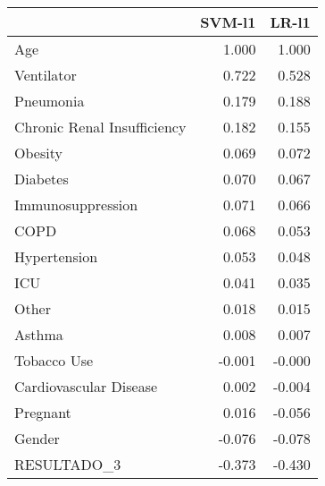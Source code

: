 \begin{tabular}{lrr}
\toprule
{} &  SVM-l1 &  LR-l1 \\
\midrule
Age                         &   1.000 &  1.000 \\
Ventilator                  &   0.722 &  0.528 \\
Pneumonia                   &   0.179 &  0.188 \\
Chronic Renal Insufficiency &   0.182 &  0.155 \\
Obesity                     &   0.069 &  0.072 \\
Diabetes                    &   0.070 &  0.067 \\
Immunosuppression           &   0.071 &  0.066 \\
COPD                        &   0.068 &  0.053 \\
Hypertension                &   0.053 &  0.048 \\
ICU                         &   0.041 &  0.035 \\
Other                       &   0.018 &  0.015 \\
Asthma                      &   0.008 &  0.007 \\
Tobacco Use                 &  -0.001 & -0.000 \\
Cardiovascular Disease      &   0.002 & -0.004 \\
Pregnant                    &   0.016 & -0.056 \\
Gender                      &  -0.076 & -0.078 \\
RESULTADO\_3                 &  -0.373 & -0.430 \\
\bottomrule
\end{tabular}
